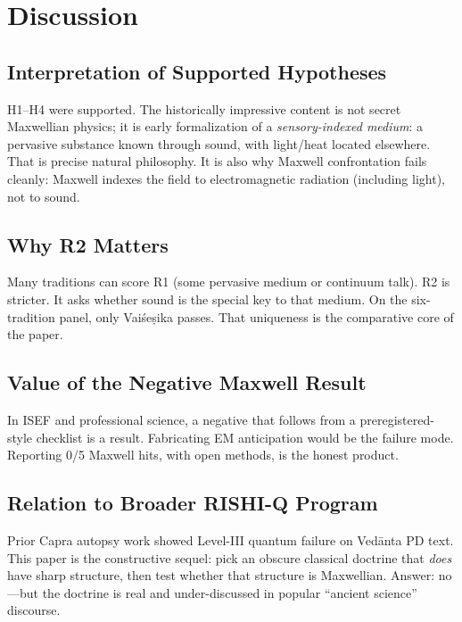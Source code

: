 \documentclass[12pt]{article}
\newcommand{\Vais}{Vaiśeṣika}
\begin{document}
\section{Discussion}

\subsection{Interpretation of Supported Hypotheses}
H1--H4 were supported.
The historically impressive content is not secret Maxwellian physics; it is early formalization of a \emph{sensory-indexed medium}: a pervasive substance known through sound, with light/heat located elsewhere.
That is precise natural philosophy.
It is also why Maxwell confrontation fails cleanly: Maxwell indexes the field to electromagnetic radiation (including light), not to sound.

\subsection{Why R2 Matters}
Many traditions can score R1 (some pervasive medium or continuum talk).
R2 is stricter.
It asks whether sound is the special key to that medium.
On the six-tradition panel, only \Vais{} passes.
That uniqueness is the comparative core of the paper.

\subsection{Value of the Negative Maxwell Result}
In ISEF and professional science, a negative that follows from a preregistered-style checklist is a result.
Fabricating EM anticipation would be the failure mode.
Reporting 0/5 Maxwell hits, with open methods, is the honest product.

\subsection{Relation to Broader RISHI-Q Program}
Prior Capra autopsy work showed Level-III quantum failure on Vedānta PD text.
This paper is the constructive sequel: pick an obscure classical doctrine that \emph{does} have sharp structure, then test whether that structure is Maxwellian.
Answer: no---but the doctrine is real and under-discussed in popular ``ancient science'' discourse.
\end{document}
